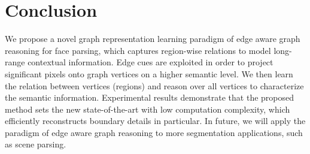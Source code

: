 \documentclass[runningheads]{llncs}
\begin{document}
\newpage


\section{Conclusion}

We propose a novel graph representation learning paradigm of edge aware graph reasoning for face parsing, which captures region-wise relations to model long-range contextual information. Edge cues are exploited in order to project significant pixels onto graph vertices on a higher semantic level. 
We then learn the relation between vertices (regions) and reason over all vertices to characterize the semantic information. 
Experimental results demonstrate that the proposed method sets the new state-of-the-art with low computation complexity, which efficiently reconstructs boundary details in particular. 
In future, we will apply the paradigm of edge aware graph reasoning to more segmentation applications, such as scene parsing.

\clearpage


\end{document}
